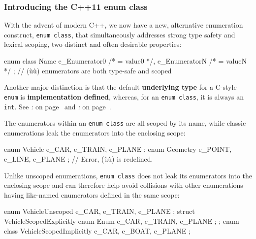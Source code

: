 \subsubsection[Introducing the C++11 {\tt enum class}]{Introducing the C++11 {\SubsubsecCode enum class}}\label{introducing-the-c++11-enum-class}

With the advent of modern C++, we now have a new, alternative
enumeration construct, \texttt{enum}~\texttt{class}, that simultaneously
addresses strong type safety and lexical scoping, two distinct and often
desirable properties:

\begin{emcppslisting}
enum class Name { e_Enumerator0 /* = value0 */, e_EnumeratorN /* = valueN */ };
    // (ù{}ù) enumerators are both type-safe and scoped
\end{emcppslisting}

\noindent Another major distinction is that the default
\textbf{underlying type} for a C-style \texttt{enum} is
\textbf{implementation defined}, whereas, for an
\texttt{enum}~\texttt{class}, it is always an \texttt{int}. See
\textit{: } on page~\pageref{enum-class-and-underlying-type} and
\textit{: } on page~\pageref{external-use-of-opaque-enumerators-enumclass}.

The enumerators within an \texttt{enum}~\texttt{class} are all scoped by
its name, while classic enumerations leak the enumerators into the
enclosing scope:

\begin{emcppslisting}
enum Vehicle  { e_CAR,   e_TRAIN, e_PLANE };
enum Geometry { e_POINT, e_LINE,  e_PLANE };  // Error, (ù{}ù) is redefined.
\end{emcppslisting}

\noindent Unlike unscoped enumerations, \texttt{enum}~\texttt{class} does not leak
its enumerators into the enclosing scope and can therefore help avoid
collisions with other enumerations having like-named enumerators defined
in the same scope:

\begin{emcppslisting}[emcppsbatch=e3]
enum       VehicleUnscoped  { e_CAR, e_TRAIN, e_PLANE };
struct     VehicleScopedExplicitly { enum Enum { e_CAR, e_TRAIN, e_PLANE }; };
enum class VehicleScopedImplicitly { e_CAR, e_BOAT,  e_PLANE };
\end{emcppslisting}

